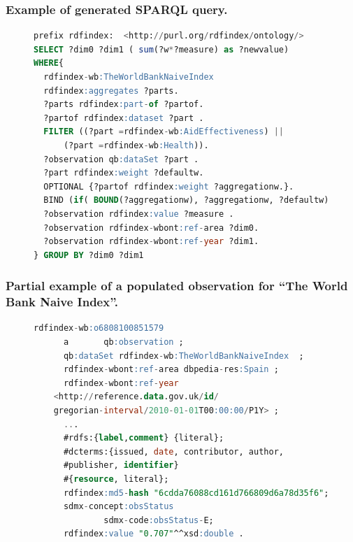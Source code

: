 \documentclass[xcolor=dvipsnames,dvip,notes=show,table]{beamer}
\begin{document}
\begin{frame}[fragile]
\frametitle{Example of generated SPARQL query.}
\begin{figure}[!ht]
\begin{lstlisting}[language=SQL,basicstyle=\scriptsize]  
prefix rdfindex:  <http://purl.org/rdfindex/ontology/> 
SELECT ?dim0 ?dim1 ( sum(?w*?measure) as ?newvalue) 
WHERE{ 
  rdfindex-wb:TheWorldBankNaiveIndex  
  rdfindex:aggregates ?parts.
  ?parts rdfindex:part-of ?partof.
  ?partof rdfindex:dataset ?part .
  FILTER ((?part =rdfindex-wb:AidEffectiveness) || 
	  (?part =rdfindex-wb:Health)). 
  ?observation qb:dataSet ?part . 
  ?part rdfindex:weight ?defaultw.        
  OPTIONAL {?partof rdfindex:weight ?aggregationw.}.
  BIND (if( BOUND(?aggregationw), ?aggregationw, ?defaultw) AS ?w)
  ?observation rdfindex:value ?measure . 
  ?observation rdfindex-wbont:ref-area ?dim0. 
  ?observation rdfindex-wbont:ref-year ?dim1. 
} GROUP BY ?dim0 ?dim1 
\end{lstlisting}
 
\end{figure}
\end{frame}




\begin{frame}[fragile]
\frametitle{Partial example of a populated observation for ``The World Bank Naive Index''.}
\begin{figure}[!ht]
\begin{lstlisting}[language=SQL,basicstyle=\scriptsize]  
rdfindex-wb:o6808100851579
      a       qb:observation ;
      qb:dataSet rdfindex-wb:TheWorldBankNaiveIndex  ;
      rdfindex-wbont:ref-area dbpedia-res:Spain ;
      rdfindex-wbont:ref-year
	<http://reference.data.gov.uk/id/
	gregorian-interval/2010-01-01T00:00:00/P1Y> ;
      ...
      #rdfs:{label,comment} {literal};
      #dcterms:{issued, date, contributor, author, 
      #publisher, identifier} 
      #{resource, literal};
      rdfindex:md5-hash "6cdda76088cd161d766809d6a78d35f6";
      sdmx-concept:obsStatus
              sdmx-code:obsStatus-E;
      rdfindex:value "0.707"^^xsd:double .
\end{lstlisting}
 
\end{figure}
\end{frame}
\end{document}

